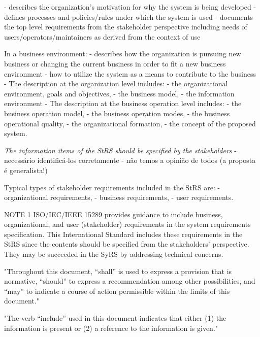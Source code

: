 
	- describes the organization's motivation for why the system is being developed
    - defines processes and policies/rules under which the system is used
    - documents the top level requirements from the stakeholder perspective including needs of users/operators/maintainers as derived from the context of use
    
In a business environment:
	- describes how the organization is pursuing new business or changing the current business in order to fit a new business environment
    - how to utilize the system as a means to contribute to the business
    - The description at the organization level includes:
    	- the organizational environment, goals and objectives,
        - the business model,
        - the information environment
    - The description at the business operation level includes:
    	- the business operation model,
        - the business operation modes,
        - the business operational quality,
        - the organizational formation,
        - the concept of the proposed system.
        
\emph{The information items of the StRS should be specified by the stakeholders}
	- necessário identificá-los corretamente
    - não temos a opinião de todos (a proposta é generalista!)

Typical types of stakeholder requirements included in the StRS are:
	- organizational requirements,
    - business requirements,
    - user requirements.

NOTE 1 ISO/IEC/IEEE 15289 provides guidance to include business, organizational, and user (stakeholder)
requirements in the system requirements specification. This International Standard includes these requirements in the
StRS since the contents should be specified from the stakeholders' perspective. They may be succeeded in the SyRS by addressing technical concerns.

	"Throughout this document, “shall” is used	 to	 express	 a	 provision	 that	 is	 normative,	 “should”	 to	 express	 a	recommendation	 among	 other	 possibilities,	 and	 “may”	 to	 indicate	 a	 course	 of action permissible	 within	 the	limits	of	this	document."
    
    "The	verb	 “include”	used	in	 this	document	indicates	 that	either	(1)	 the	information	is	present	or	 (2)	 a	reference to	the	information	is	given."
    
